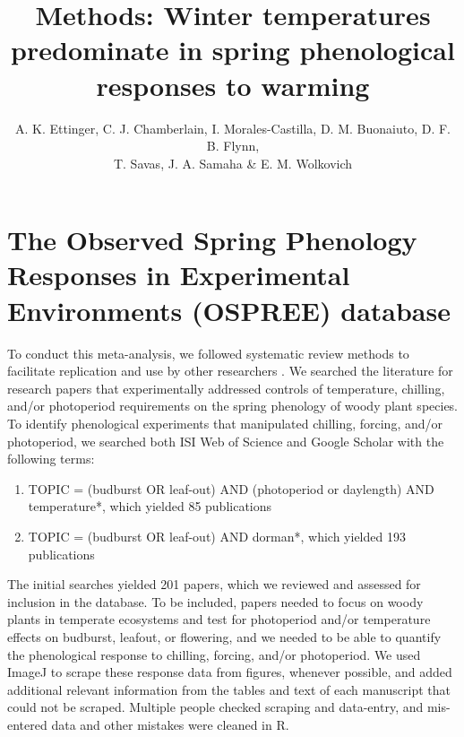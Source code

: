 \documentclass{article}
\begin{document}

\title{Methods:  Winter temperatures predominate in spring phenological responses to warming} 

\author{A. K. Ettinger, C. J. Chamberlain, I. Morales-Castilla, D. M. Buonaiuto, D. F. B. Flynn, \\ T. Savas, J. A. Samaha \& E. M. Wolkovich}
\date{} 
\maketitle  
\section*{The Observed Spring Phenology Responses in Experimental Environments (OSPREE) database}
\par To conduct this meta-analysis, we followed systematic review methods to facilitate replication and use by other researchers \emph{\citep[e.g., {\normalfont we include at least 22/27 items on the PRISMA checklist, as summarized in Appendix 1,}][]{moher2009}}. We searched the literature for research papers that experimentally addressed controls of temperature, chilling, and/or photoperiod requirements on the spring phenology of woody plant species. To identify phenological experiments that manipulated chilling, forcing, and/or photoperiod, we searched both ISI Web of Science and Google Scholar with the following terms: 
\begin{enumerate}
\item TOPIC = (budburst OR leaf-out) AND (photoperiod or daylength) AND temperature*, which yielded 85 publications

\item TOPIC = (budburst OR leaf-out) AND dorman*, which yielded 193 publications
\end{enumerate}



The initial searches yielded 201 papers, which we reviewed and assessed for inclusion in the database. To be included, papers needed to focus on woody plants in temperate ecosystems and test for photoperiod and/or temperature effects on budburst, leafout, or flowering, and we needed to be able to quantify the phenological response to chilling, forcing, and/or photoperiod. We used ImageJ to scrape these response data from figures, whenever possible, and added additional relevant information from the tables and text of each manuscript that could not be scraped. Multiple people checked scraping and data-entry, and mis-entered data and other mistakes were cleaned in R.
\end{document}
